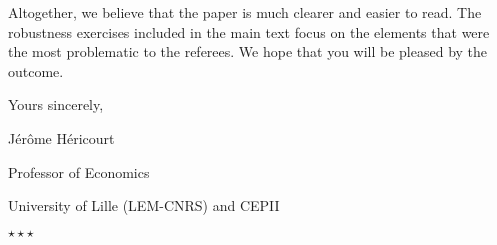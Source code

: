 \documentclass[12pt]{article}
\newcommand*\sepstars{%
  \begin{center}
    $\star\star\star$
  \end{center}}
\begin{document}
Altogether, we believe that the paper is much clearer and easier to read. The robustness exercises included in the main text focus on the elements that were the most problematic to the referees. We hope that you will be pleased by the outcome.

\bigskip

Yours sincerely,

\bigskip

\hfill Jérôme Héricourt

\hfill Professor of Economics

\hfill University of Lille (LEM-CNRS) and CEPII

\bigskip
\bigskip
\bigskip
\sepstars
\end{document}
